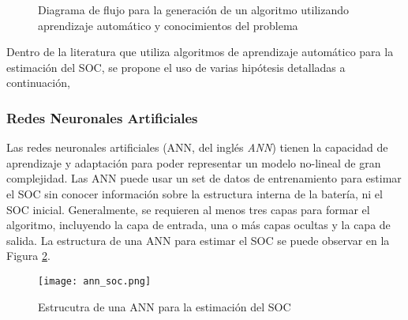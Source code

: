 \begin{figure}[h!]
    \begin{center}
    \end{center}
    \caption{Diagrama de flujo para la generaci\'on de un algoritmo 
    utilizando aprendizaje autom\'atico y conocimientos del problema}
    \label{ml_ext_approach}
\end{figure}
\FloatBarrier

\noindent Dentro de la literatura que utiliza algoritmos de aprendizaje
autom\'atico para la estimaci\'on del \acrshort{SOC}, se propone el uso de
varias hip\'otesis detalladas a continuaci\'on,

\subsubsection{Redes Neuronales Artificiales}

\noindent Las redes neuronales artificiales (\acrshort{ANN}, del ingl\'es
\emph{\acrlong{ANN}}) tienen la capacidad de aprendizaje y adaptaci\'on para
poder representar un modelo no-lineal de gran complejidad. Las \acrshort{ANN}
puede usar un set de datos de entrenamiento para estimar el \acrshort{SOC} sin
conocer informaci\'on sobre la estructura interna de la bater\'ia, ni el
\acrshort{SOC} inicial. Generalmente, se requieren al menos tres capas para
formar el algoritmo, incluyendo la capa de entrada, una o m\'as capas ocultas y
la capa de salida. La estructura de una \acrshort{ANN} para estimar el
\acrshort{SOC} se puede observar en la Figura \ref{ann_soc_layers}.

\begin{figure}[h!]
    \begin{center}
        \texttt{[image: ann\_soc.png]}
        \caption{Estrucutra de una \acrshort{ANN} para la estimaci\'on del
        \acrshort{SOC}}
        \label{ann_soc_layers}
    \end{center}
\end{figure}

